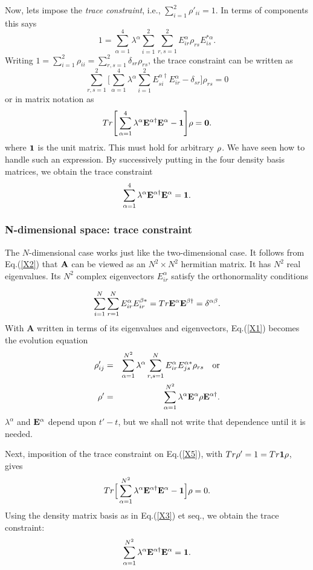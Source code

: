 \documentclass[aps,pra,amssymb, amsfonts,amsmath,showpacs, superscriptaddress,12pt]{revtex4}
\begin{document}
	Now, lets impose the \textit{trace  constraint}, i.e., $\sum_{i=1}^{2}\rho'_{ii}=1$.  In terms of components this says
\[
1=\sum_{\alpha=1}^{4}\lambda^{\alpha}\sum_{i=1}^{2}\sum_{r,s=1}^{2}E^{\alpha}_{ir}\rho_{rs}E^{*\alpha}_{is}.
\] 
\noindent Writing $1=\sum_{i=1}^{2}\rho_{ii}=\sum_{r,s=1}^{2}\delta_{sr}\rho_{rs}$, the trace  constraint can be written as 
\[
\sum_{r,s=1}^{2}\Bigg[\sum_{\alpha=1}^{4}\lambda^{\alpha}\sum_{i=1}^{2}E^{\alpha\dagger}_{si}E^{\alpha}_{ir}-\delta_{sr}\Bigg]\rho_{rs}=0
\]
\noindent or in matrix notation as
\[
Tr\Bigg[\sum_{\alpha=1}^{4}\lambda^{\alpha}{\bf E}^{\alpha\dagger}\bf E^{\alpha}-{\bf 1}\Bigg]{\bf \rho}=0.
\]
\noindent where ${\bf 1}$ is the unit matrix. This must hold for arbitrary ${\bf \rho}$.  We have seen how to handle 
such an expression.  By successively putting in the four density basis matrices, we obtain the trace constraint
\[
\sum_{\alpha=1}^{4}\lambda^{\alpha}{\bf E}^{\alpha\dagger}\bf E^{\alpha}=\bf 1.
\] 

\subsubsection{N-dimensional space: trace constraint}


The $N$-dimensional case works just like the two-dimensional case. It  follows from Eq.(\ref{X2}) that ${\bf A}$ can be viewed as  an $N^{2}\times N^{2}$ hermitian matrix.  It has $N^{2}$ real eigenvalues. Its  $N^{2}$  complex eigenvectors $E_{ir}^{\alpha}$ satisfy the orthonormality conditions

\begin{equation}\label{X4a}
\sum_{i=1}^{N}\sum_{r=1}^{N}E_{ir}^{\alpha}E_{ir}^{\beta*}
=Tr{\bf E}^{\alpha}{\bf E}^{\beta\dagger} =\delta^{\alpha\beta}.
\end{equation}
\noindent With {\bf A}  written in terms of its eigenvalues and eigenvectors, Eq.(\ref{X1}) becomes the evolution equation 
\begin{eqnarray}\label{X5}
\rho'_{ij}&=&\sum_{\alpha=1}^{N^{2}}\lambda^{\alpha}\sum_{r,s=1}^{N}E_{ir}^{\alpha}E_{js}^{\alpha*}\rho_{rs}\quad\hbox{or}\nonumber\\
 {\bf \rho}'&=&\sum_{\alpha=1}^{N^{2}}\lambda^{\alpha}{\bf E}^{\alpha}{\bf\rho} {\bf E}^{\alpha\dagger}.
\end{eqnarray}
\noindent  $\lambda^{\alpha}$ and ${\bf E}^{\alpha}$ depend upon $t'-t$, but we shall not write that dependence until it is needed.  


	Next, imposition of the trace constraint on Eq.(\ref{X5}),  with  $Tr{\bf \rho}'=1=Tr{\bf 1\rho}$,  gives
\[
Tr\Big[\sum_{\alpha=1}^{N^{2}}\lambda^{\alpha}{\bf E}^{\alpha\dagger}{\bf E}^{\alpha}-{\bf 1}\Big]{\bf \rho} =0.
\]
\noindent Using the density matrix basis as in Eq.(\ref{X3}) et seq., we obtain the trace constraint: 
\begin{equation}\label{X6}
\sum_{\alpha=1}^{N^{2}}\lambda^{\alpha}{\bf E}^{\alpha\dagger}{\bf E}^{\alpha}={\bf 1}.
\end{equation}
\end{document}
